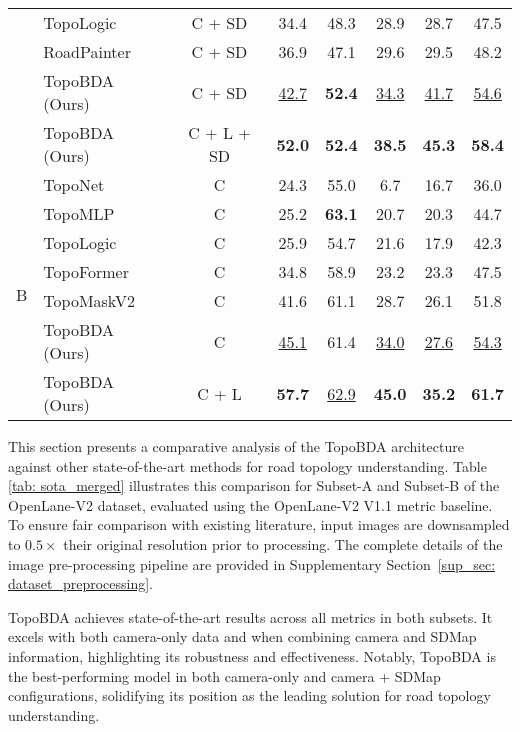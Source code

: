 \begin{table}[t]
{\begin{tabular}{llcccccc}
 & TopoLogic \cite{fu2024topologic} & C + SD & 34.4 & 48.3 & 28.9 & 28.7 & 47.5 \\ 
 & RoadPainter \cite{ma2024roadpainter} & C + SD & 36.9 & 47.1 & 29.6 & 29.5 & 48.2 \\
 \rowcolor{lightgray} & TopoBDA (Ours) & C + SD & \underline{42.7} & \textbf{52.4} & \underline{34.3} & \underline{41.7} & \underline{54.6} \\
 \rowcolor{lightgray} & TopoBDA (Ours) & C + L + SD & \textbf{52.0} & \textbf{52.4} & \textbf{38.5} & \textbf{45.3} & \textbf{58.4} \\
\midrule  
\multirow{7}{*}{B} & TopoNet \cite{li2023graph} & C & 24.3 & 55.0 & 6.7 & 16.7 & 36.0 \\
 & TopoMLP \cite{wu2023topomlp} & C & 25.2 & \textbf{63.1} & 20.7 & 20.3 & 44.7 \\
 & TopoLogic \cite{fu2024topologic} & C & 25.9 & 54.7 & 21.6 & 17.9 & 42.3 \\
 & TopoFormer \cite{lv2024t2sg} & C & 34.8 & 58.9 & 23.2 & 23.3 & 47.5 \\
 & TopoMaskV2 \cite{kalfaoglu2024topomaskv2} & C & 41.6 & 61.1 & 28.7 & 26.1 & 51.8 \\
 \rowcolor{lightgray} & TopoBDA (Ours) & C & \underline{45.1} & 61.4 & \underline{34.0} & \underline{27.6} & \underline{54.3} \\
 \rowcolor{lightgray} & TopoBDA (Ours) & C + L & \textbf{57.7} & \underline{62.9} & \textbf{45.0} & \textbf{35.2} & \textbf{61.7} \\
\bottomrule
\end{tabular}
}
\end{table}


This section presents a comparative analysis of the TopoBDA architecture against other state-of-the-art methods for road topology understanding. Table \ref{tab: sota_merged} illustrates this comparison for Subset-A and Subset-B of the OpenLane-V2 dataset, evaluated using the OpenLane-V2 V1.1 metric baseline. To ensure fair comparison with existing literature, input images are downsampled to $0.5\times$ their original resolution prior to processing. The complete details of the image pre-processing pipeline are provided in Supplementary Section~\ref{sup_sec: dataset_preprocessing}.

TopoBDA achieves state-of-the-art results across all metrics in both subsets. It excels with both camera-only data and when combining camera and SDMap information, highlighting its robustness and effectiveness. Notably, TopoBDA is the best-performing model in both camera-only and camera + SDMap configurations, solidifying its position as the leading solution for road topology understanding.

